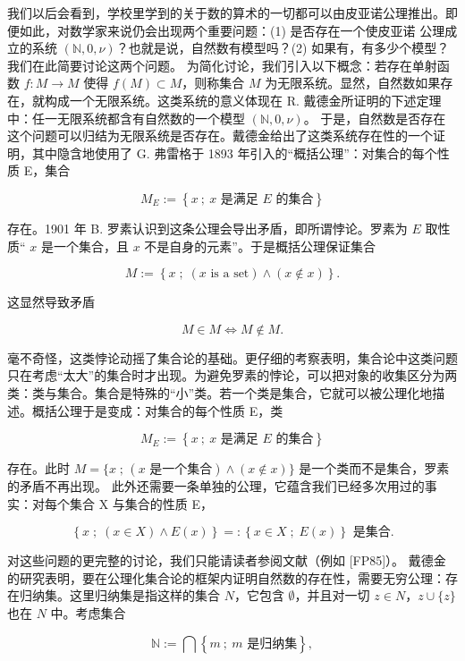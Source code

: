 \begin{remark}

\begin{items}
\item

我们以后会看到，学校里学到的关于数的算术的一切都可以由皮亚诺公理推出。即便如此，对数学家来说仍会出现两个重要问题：(1) 是否存在一个使皮亚诺
公理成立的系统 $ (\mathbb{N}, 0, \nu) $？也就是说，自然数有模型吗？(2) 如果有，有多少个模型？我们在此简要讨论这两个问题。
为简化讨论，我们引入以下概念：若存在单射函数 $f: M \to M$ 使得 $f(M) \subset M$，则称集合 $M$ 为无限系统。显然，自然数如果存在，就构成一个无限系统。这类系统的意义体现在 R. 戴德金所证明的下述定理中：任一无限系统都含有自然数的一个模型 $(\mathbb{N}, 0, \nu)$。
于是，自然数是否存在这个问题可以归结为无限系统是否存在。戴德金给出了这类系统存在性的一个证明，其中隐含地使用了 G. 弗雷格于 1893 年引入的“概括公理”：对集合的每个性质 E，集合

\[
M_{E}:=\left\{x~;~x\text{ 是满足 }E\text{ 的集合}\right\}
\]

存在。1901 年 B. 罗素认识到这条公理会导出矛盾，即所谓悖论。罗素为 $ E $ 取性质“ $ x $ 是一个集合，且 $ x $ 不是自身的元素”。于是概括公理保证集合

\[
M:=\left\{x\;;\;(x\text{ is a set})\land(x\notin x)\right\}.
\]

这显然导致矛盾

\[
M\in M\Longleftrightarrow M\notin M.
\]

毫不奇怪，这类悖论动摇了集合论的基础。更仔细的考察表明，集合论中这类问题只在考虑“太大”的集合时才出现。为避免罗素的悖论，可以把对象的收集区分为两类：类与集合。集合是特殊的“小”类。若一个类是集合，它就可以被公理化地描述。概括公理于是变成：对集合的每个性质 E，类

\[
M_{E}:=\left\{x~;~x\text{ 是满足 }E\text{ 的集合}\right\}
\]

存在。此时 $ M = \{x \;; \, (x \text{ 是一个集合}) \land (x \notin x)\} $ 是一个类而不是集合，罗素的矛盾不再出现。
此外还需要一条单独的公理，它蕴含我们已经多次用过的事实：对每个集合 X 与集合的性质 E，

\[
\left\{x\;;\;(x\in X)\land E(x)\right\}=:\left\{x\in X\;;\;E(x)\right\}\text{ 是集合}.
\]

对这些问题的更完整的讨论，我们只能请读者参阅文献（例如 [FP85]）。
戴德金的研究表明，要在公理化集合论的框架内证明自然数的存在性，需要无穷公理：存在归纳集。这里归纳集是指这样的集合 $N$，它包含 $\emptyset$，并且对一切 $z \in N$，$z \cup \{z\}$ 也在 $N$ 中。考虑集合

\[
\mathbb{N}:=\bigcap\left\{m~;~m\text{ 是归纳集}\right\},
\]


\end{items}
\end{remark}
